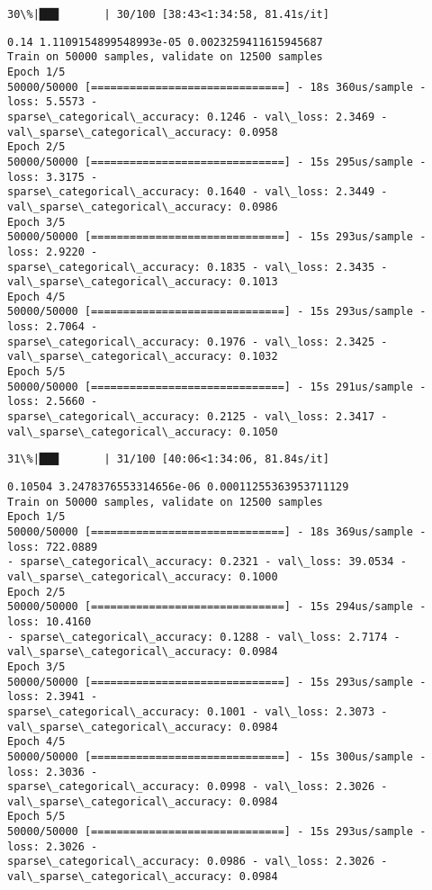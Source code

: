 \documentclass[11pt]{article}
\begin{document}
    \begin{Verbatim}[commandchars=\\\{\}]
 30\%|███       | 30/100 [38:43<1:34:58, 81.41s/it]
    \end{Verbatim}

    \begin{Verbatim}[commandchars=\\\{\}]
0.14 1.1109154899548993e-05 0.0023259411615945687
Train on 50000 samples, validate on 12500 samples
Epoch 1/5
50000/50000 [==============================] - 18s 360us/sample - loss: 5.5573 -
sparse\_categorical\_accuracy: 0.1246 - val\_loss: 2.3469 -
val\_sparse\_categorical\_accuracy: 0.0958
Epoch 2/5
50000/50000 [==============================] - 15s 295us/sample - loss: 3.3175 -
sparse\_categorical\_accuracy: 0.1640 - val\_loss: 2.3449 -
val\_sparse\_categorical\_accuracy: 0.0986
Epoch 3/5
50000/50000 [==============================] - 15s 293us/sample - loss: 2.9220 -
sparse\_categorical\_accuracy: 0.1835 - val\_loss: 2.3435 -
val\_sparse\_categorical\_accuracy: 0.1013
Epoch 4/5
50000/50000 [==============================] - 15s 293us/sample - loss: 2.7064 -
sparse\_categorical\_accuracy: 0.1976 - val\_loss: 2.3425 -
val\_sparse\_categorical\_accuracy: 0.1032
Epoch 5/5
50000/50000 [==============================] - 15s 291us/sample - loss: 2.5660 -
sparse\_categorical\_accuracy: 0.2125 - val\_loss: 2.3417 -
val\_sparse\_categorical\_accuracy: 0.1050
    \end{Verbatim}

    \begin{Verbatim}[commandchars=\\\{\}]
 31\%|███       | 31/100 [40:06<1:34:06, 81.84s/it]
    \end{Verbatim}

    \begin{Verbatim}[commandchars=\\\{\}]
0.10504 3.2478376553314656e-06 0.00011255363953711129
Train on 50000 samples, validate on 12500 samples
Epoch 1/5
50000/50000 [==============================] - 18s 369us/sample - loss: 722.0889
- sparse\_categorical\_accuracy: 0.2321 - val\_loss: 39.0534 -
val\_sparse\_categorical\_accuracy: 0.1000
Epoch 2/5
50000/50000 [==============================] - 15s 294us/sample - loss: 10.4160
- sparse\_categorical\_accuracy: 0.1288 - val\_loss: 2.7174 -
val\_sparse\_categorical\_accuracy: 0.0984
Epoch 3/5
50000/50000 [==============================] - 15s 293us/sample - loss: 2.3941 -
sparse\_categorical\_accuracy: 0.1001 - val\_loss: 2.3073 -
val\_sparse\_categorical\_accuracy: 0.0984
Epoch 4/5
50000/50000 [==============================] - 15s 300us/sample - loss: 2.3036 -
sparse\_categorical\_accuracy: 0.0998 - val\_loss: 2.3026 -
val\_sparse\_categorical\_accuracy: 0.0984
Epoch 5/5
50000/50000 [==============================] - 15s 293us/sample - loss: 2.3026 -
sparse\_categorical\_accuracy: 0.0986 - val\_loss: 2.3026 -
val\_sparse\_categorical\_accuracy: 0.0984
    \end{Verbatim}
\end{document}
